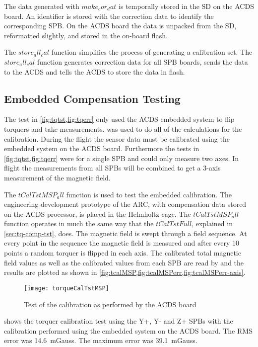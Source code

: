 The data generated with \lstMat$make_cor_dat$ is temporally stored in the \ac{SD} on the \ac{ACDS} board. An identifier is stored with the correction data to identify the corresponding \ac{SPB}. On the \ac{ACDS} board the data is unpacked from the \ac{SD}, reformatted slightly, and stored in the on-board flash. 

The \lstMat$store_all_cal$ function simplifies the process of generating a calibration set. The \lstMat$store_all_cal$ function generates correction data for all \ac{SPB} boards, sends the data to the \ac{ACDS} and tells the \ac{ACDS} to store the data in flash. 

\subsection{Embedded Compensation Testing}

The test in \cref{fig:tqtst,fig:tqerr} only used the \ac{ACDS} embedded system to flip torquers and take measurements. \matlab was used to do all of the calculations for the calibration. During the flight the sensor data must be calibrated using the embedded system on the \ac{ACDS} board. Furthermore the tests in \cref{fig:tqtst,fig:tqerr} were for a single \ac{SPB} and could only measure two axes. In flight the measurements from all \acp{SPB} will be combined to get a 3-axis measurement of the magnetic field.

The \lstMat$tCalTstMSP_all$ function is used to test the embedded calibration. The engineering development prototype of the \ac{ARC}, with compensation data stored on the \ac{ACDS} processor, is placed in the Helmholtz cage. The \lstMat$tCalTstMSP_all$ function operates in much the same way that the \lstMat$tCalTstFull$, explained in \cref{sec:tq-comp-tst}, does. The magnetic field is swept through a field sequence. At every point in the sequence the magnetic field is measured and after every 10 points a random torquer is flipped in each axis. The calibrated total magnetic field values as well as the calibrated values from each \ac{SPB} are read by \matlab and the results are plotted as shown in \cref{fig:tcalMSP,fig:tcalMSPerr,fig:tcalMSPerr-axis}.

\begin{figure}[!ht]
    \centering
    \texttt{[image: torqueCalTstMSP]}
    \caption{Test of the calibration as performed by the \ac{ACDS} board}
    \label{fig:tcalMSP}
\end{figure}

 shows the torquer calibration test using the Y+, Y- and Z+ \acp{SPB} with the calibration performed using the embedded system on the \ac{ACDS} board. The RMS error was 14.6~mGauss. The maximum error was 39.1~mGauss.

